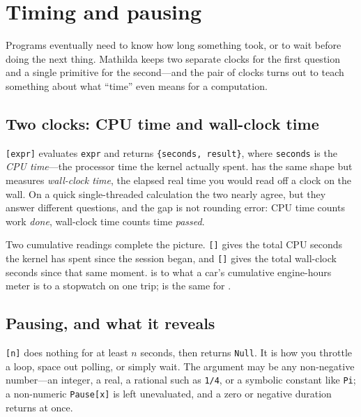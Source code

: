 \section{Timing and pausing}
\label{sec:prog-timing}

Programs eventually need to know how long something took, or to wait before doing
the next thing. Mathilda keeps two separate clocks for the first question and a
single primitive for the second---and the pair of clocks turns out to teach
something about what ``time'' even means for a computation.

\subsection{Two clocks: CPU time and wall-clock time}
\label{ssec:prog-two-clocks}

\texttt{[expr]} evaluates \texttt{expr} and returns
\texttt{\{seconds, result\}}, where \texttt{seconds} is the \emph{CPU time}---the
processor time the kernel actually spent.  has the same shape but
measures \emph{wall-clock time}, the elapsed real time you would read off a clock
on the wall. On a quick single-threaded calculation the two nearly agree, but they
answer different questions, and the gap is not rounding error: CPU time counts work
\emph{done}, wall-clock time counts time \emph{passed}.

Two cumulative readings complete the picture. \texttt{[]} gives the
total CPU seconds the kernel has spent since the session began, and
\texttt{[]} gives the total wall-clock seconds since that same
moment.  is to  what a car's cumulative
engine-hours meter is to a stopwatch on one trip;  is the same
for .

\subsection{Pausing, and what it reveals}
\label{ssec:prog-pause}

\texttt{[n]} does nothing for at least \(n\) seconds, then returns
\texttt{Null}. It is how you throttle a loop, space out polling, or simply wait.
The argument may be any non-negative number---an integer, a real, a rational such
as \texttt{1/4}, or a symbolic constant like \texttt{Pi}; a non-numeric
\texttt{Pause[x]} is left unevaluated, and a zero or negative duration returns at
once.

